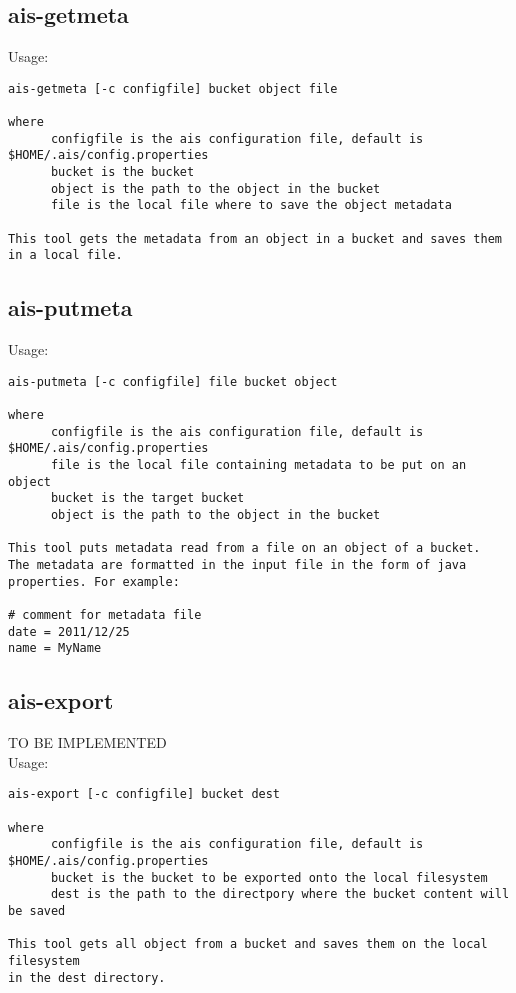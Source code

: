 \documentclass[11pt]{article}
\begin{document}
\subsection{ais-getmeta}
Usage:\\
\begin{verbatim}
ais-getmeta [-c configfile] bucket object file

where 
      configfile is the ais configuration file, default is $HOME/.ais/config.properties
      bucket is the bucket
      object is the path to the object in the bucket
      file is the local file where to save the object metadata
      
This tool gets the metadata from an object in a bucket and saves them in a local file.
\end{verbatim}
\subsection{ais-putmeta}
Usage:\\
\begin{verbatim}
ais-putmeta [-c configfile] file bucket object

where 
      configfile is the ais configuration file, default is $HOME/.ais/config.properties
      file is the local file containing metadata to be put on an object
      bucket is the target bucket
      object is the path to the object in the bucket
      
This tool puts metadata read from a file on an object of a bucket.
The metadata are formatted in the input file in the form of java properties. For example:

# comment for metadata file
date = 2011/12/25
name = MyName
\end{verbatim}
\subsection{ais-export}
TO BE IMPLEMENTED\\
Usage:\\
\begin{verbatim}
ais-export [-c configfile] bucket dest

where 
      configfile is the ais configuration file, default is $HOME/.ais/config.properties
      bucket is the bucket to be exported onto the local filesystem
      dest is the path to the directpory where the bucket content will be saved
      
This tool gets all object from a bucket and saves them on the local filesystem 
in the dest directory.
\end{verbatim}
\end{document}
